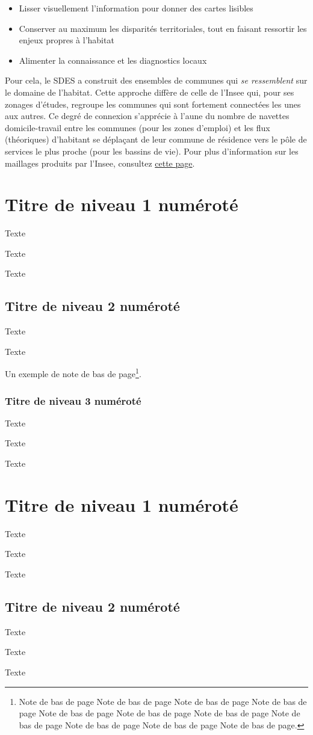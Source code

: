 \documentclass[12pt, a4paper]{article}
\begin{document}
\begin{itemize}
\item Lisser visuellement l'information pour donner des cartes lisibles
\item Conserver au maximum les disparités territoriales, tout en faisant ressortir les enjeux propres à l'habitat
\item Alimenter la connaissance et les diagnostics locaux
\end{itemize}


Pour cela, le SDES a construit des ensembles de communes qui \emph{se ressemblent} sur le domaine de l'habitat. Cette approche diffère de celle de l'Insee qui, pour ses zonages d'études, regroupe les communes qui sont fortement connectées les unes aux autres. Ce degré de connexion s'apprécie à l'aune du nombre de navettes domicile-travail entre les communes (pour les zones d'emploi) et les flux (théoriques) d'habitant se déplaçant de leur commune de résidence vers le pôle de services le plus proche (pour les bassins de vie). Pour plus d'information sur les maillages produits par l'Insee, consultez \href{https://www.insee.fr/fr/information/2114631}{cette page}.

\section{Titre de niveau 1 numéroté}

Texte

Texte

Texte

\subsection{Titre de niveau 2 numéroté}

Texte

Texte

Un exemple de note de bas de page\footnote{Note de bas de page Note de bas de page Note de bas de page Note de bas de page Note de bas de page Note de bas de page Note de bas de page Note de bas de page Note de bas de page Note de bas de
page Note de bas de page.}.

\subsubsection{Titre de niveau 3 numéroté}

Texte

Texte

Texte


\section{Titre de niveau 1 numéroté}

Texte

Texte

Texte

\subsection{Titre de niveau 2 numéroté}

Texte

Texte

Texte

\nocite{*}
%
%
\end{document}
